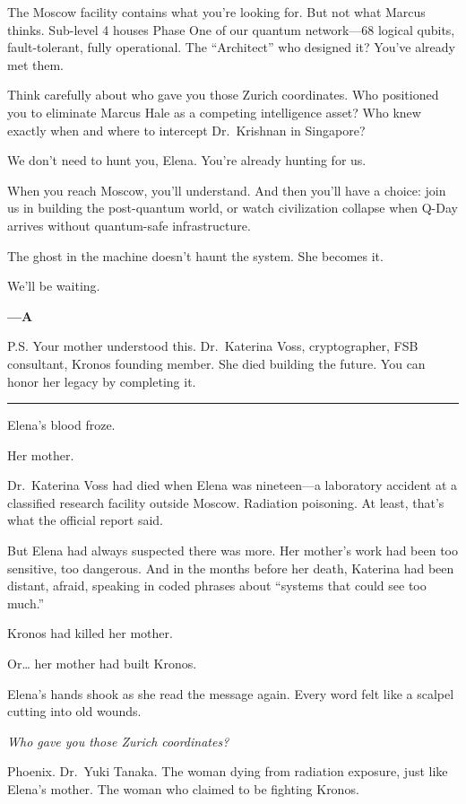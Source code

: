 The Moscow facility contains what you're looking for. But not what Marcus thinks. Sub-level 4 houses Phase One of our quantum network---68 logical qubits, fault-tolerant, fully operational. The ``Architect'' who designed it? You've already met them.

Think carefully about who gave you those Zurich coordinates. Who positioned you to eliminate Marcus Hale as a competing intelligence asset? Who knew exactly when and where to intercept Dr.~Krishnan in Singapore?

We don't need to hunt you, Elena. You're already hunting for us.

When you reach Moscow, you'll understand. And then you'll have a choice: join us in building the post-quantum world, or watch civilization collapse when Q-Day arrives without quantum-safe infrastructure.

The ghost in the machine doesn't haunt the system. She becomes it.

We'll be waiting.

\textbf{---A}

P.S. Your mother understood this. Dr.~Katerina Voss, cryptographer, FSB consultant, Kronos founding member. She died building the future. You can honor her legacy by completing it.

\begin{center}\rule{0.5\linewidth}{0.5pt}\end{center}

Elena's blood froze.

Her mother.

Dr.~Katerina Voss had died when Elena was nineteen---a laboratory accident at a classified research facility outside Moscow. Radiation poisoning. At least, that's what the official report said.

But Elena had always suspected there was more. Her mother's work had been too sensitive, too dangerous. And in the months before her death, Katerina had been distant, afraid, speaking in coded phrases about ``systems that could see too much.''

Kronos had killed her mother.

Or\ldots{} her mother had built Kronos.

Elena's hands shook as she read the message again. Every word felt like a scalpel cutting into old wounds.

\emph{Who gave you those Zurich coordinates?}

Phoenix. Dr.~Yuki Tanaka. The woman dying from radiation exposure, just like Elena's mother. The woman who claimed to be fighting Kronos.


